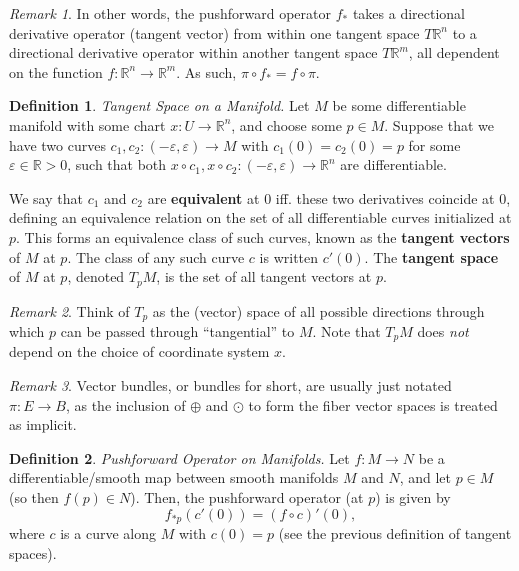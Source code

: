 \documentclass[10pt,landscape]{article}
\theoremstyle{definition}
\newtheorem{definition}{Definition}[section]
\theoremstyle{theorem}
\theoremstyle{summary}
\theoremstyle{remark}
\newtheorem*{remark}{Remark}
\newcommand{\R}{\mathbb{R}}
\newcommand{\Rn}{\mathbb{R}^n}
\begin{document}
\begin{multicols*}{3}
\begin{remark}
In other words, the pushforward operator $f_*$ takes a directional derivative operator (tangent vector) from within one tangent space $T\Rn$ to a directional derivative operator within another tangent space $T\R^m$, all dependent on the function $f:\Rn\rightarrow\R^m$. As such, $\pi\circ f_* = f \circ \pi$.
\end{remark}

\theoremstyle{definition}
\begin{definition}{\textit{Tangent Space on a Manifold.}}
    Let $M$ be some differentiable manifold with some chart $x:U\rightarrow\Rn$, and choose some $p\in M$. Suppose that we have two curves $c_1,c_2:(-\varepsilon,\varepsilon)\rightarrow M$ with $c_1(0)=c_2(0) = p$ for some $\varepsilon\in\R>0$, such that both $x\circ c_1, x\circ c_2:(-\varepsilon,\varepsilon)\rightarrow \Rn$ are differentiable.

    We say that $c_1$ and $c_2$ are \textbf{equivalent} at $0$ iff. these two derivatives coincide at $0$, defining an equivalence relation on the set of all differentiable curves initialized at $p$. This forms an equivalence class of such curves, known as the \textbf{tangent vectors} of $M$ at $p$. The class of any such curve $c$ is written $c'(0)$. The \textbf{tangent space} of $M$ at $p$, denoted $T_pM$, is the set of all tangent vectors at $p$.
\end{definition}

\begin{remark}
    Think of $T_p$ as the (vector) space of all possible directions through which $p$ can be passed through ``tangential'' to $M$. Note that $T_pM$ does \textit{not} depend on the choice of coordinate system $x$. 
\end{remark}


\begin{remark}
Vector bundles, or bundles for short, are usually just notated $\pi: E\rightarrow B$, as the inclusion of $\oplus$ and $\odot$ to form the fiber vector spaces is treated as implicit.
\end{remark}

\theoremstyle{definition}
\begin{definition}{\textit{Pushforward Operator on Manifolds.}}
    \label{def_pushforward}
    Let $f:M\rightarrow N$ be a differentiable/smooth map between smooth manifolds $M$ and $N$, and let $p\in M$ (so then $f(p)\in N$). Then, the pushforward operator (at $p$) is given by
    \begin{equation}
        f_{*p}(c'(0)) = (f\circ c)'(0),
    \end{equation}
    where $c$ is a curve along $M$ with $c(0) = p$ (see the previous definition of tangent spaces).
\end{definition}


\end{multicols*}
\end{document}
